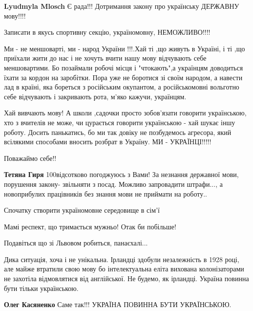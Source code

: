 \begin{itemize}
\begin{itemize}
\textbf{Lyudmyla Mlosch} Є рада!!! Дотримання закону про українську ДЕРЖАВНУ мову!!!!
\end{itemize} %

Записати в якусь спортивну секцію, україномовну, НЕМОЖЛИВО!!!!


Ми - не меншоварті, ми - народ України !!!.Хай ті ,що живуть в Україні, і ті
,що приїхали жити до нас і не хочуть вчити нашу мову відчувають себе
меншовартими. Бо позаймали робочі місця і "чтокають",а українцям доводиться
їхати за кордон на заробітки. Пора уже не боротися зі своїм народом, а навести
лад в країні, яка бореться з російським окупантом, а російськомовні вольготно
себе відчувають і закривають рота, м'яко кажучи, українцям.

Хай вивчають мову! А школи ,садочки просто зобов'язати говорити українською, хто
з вчителів не може, чи цурається говорити українською - хай шукає іншу
роботу. Досить панькатись, бо ми так довіку не позбудемось агресора, який
всілякими способами вносить розбрат в Україну. МИ - УКРАЇНЦІ!!!!!

Поважаймо себе!!

\begin{itemize} %
\textbf{Тетяна Гиря} 100відсотково погоджуюсь з Вами!
За незнання державної мови, порушення закону- звільняти з посад. Можливо запровадити штрафи..., а новоприбулих працівників
без знання мови не приймати на роботу..
\end{itemize} %

Спочатку створити україномовне середовище в сім'ї

Мамі респект, що тримається мужньо! Отак би побільше!

Подавіться що зі Львовом робиться, панаєхалі...


Дика ситуація, хоча і не унікальна. Ірландці здобули незалежність в 1928 році,
але майже втратили свою мову бо інтелектуальна еліта вихована колонізаторами не
захотіла відмовлятися від англійської. Не будемо, як ірландці. Україна повинна
бути тільки українською.

\begin{itemize} %
\textbf{Олег Касяненко} Саме так!!! УКРАЇНА ПОВИННА БУТИ УКРАЇНСЬКОЮ.
\end{itemize} %


\end{itemize}
